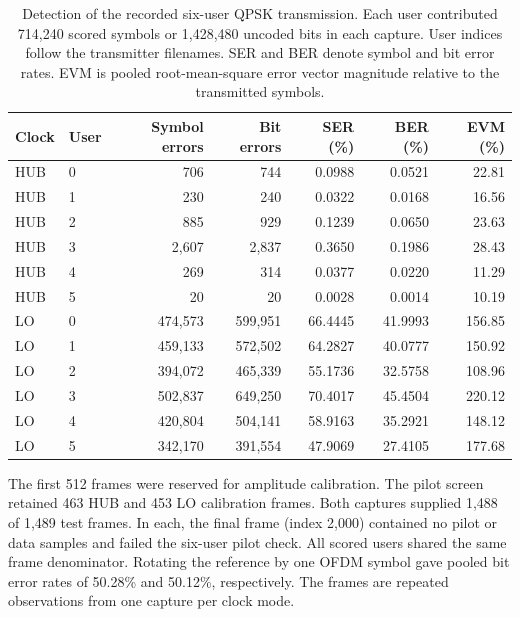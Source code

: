 \begin{table}[!htbp]\ContinuedFloat{}\centering\small
\caption{Detection of the recorded six-user QPSK transmission. Each user contributed 714,240 scored symbols or 1,428,480 uncoded bits in each capture. User indices follow the transmitter filenames. SER and BER denote symbol and bit error rates. EVM is pooled root-mean-square error vector magnitude relative to the transmitted symbols.}
\label{supp:payload}
\begin{tabular}{llrrrrr}\toprule
Clock & User & Symbol errors & Bit errors & SER (\%) & BER (\%) & EVM (\%)\\
\midrule
HUB & 0 & 706 & 744 & 0.0988 & 0.0521 & 22.81\\
HUB & 1 & 230 & 240 & 0.0322 & 0.0168 & 16.56\\
HUB & 2 & 885 & 929 & 0.1239 & 0.0650 & 23.63\\
HUB & 3 & 2,607 & 2,837 & 0.3650 & 0.1986 & 28.43\\
HUB & 4 & 269 & 314 & 0.0377 & 0.0220 & 11.29\\
HUB & 5 & 20 & 20 & 0.0028 & 0.0014 & 10.19\\
\midrule
LO & 0 & 474,573 & 599,951 & 66.4445 & 41.9993 & 156.85\\
LO & 1 & 459,133 & 572,502 & 64.2827 & 40.0777 & 150.92\\
LO & 2 & 394,072 & 465,339 & 55.1736 & 32.5758 & 108.96\\
LO & 3 & 502,837 & 649,250 & 70.4017 & 45.4504 & 220.12\\
LO & 4 & 420,804 & 504,141 & 58.9163 & 35.2921 & 148.12\\
LO & 5 & 342,170 & 391,554 & 47.9069 & 27.4105 & 177.68\\
\bottomrule\end{tabular}
\par\medskip\begin{minipage}{0.96\linewidth}\small
The first 512 frames were reserved for amplitude calibration. The pilot screen retained 463 HUB and 453 LO calibration frames. Both captures supplied 1,488 of 1,489 test frames. In each, the final frame (index 2,000) contained no pilot or data samples and failed the six-user pilot check. All scored users shared the same frame denominator. Rotating the reference by one OFDM symbol gave pooled bit error rates of 50.28\% and 50.12\%, respectively. The frames are repeated observations from one capture per clock mode.
\end{minipage}
\end{table}
